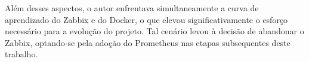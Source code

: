 Além desses aspectos, o autor enfrentava simultaneamente a curva de aprendizado do Zabbix e do Docker, o que elevou significativamente o esforço necessário para a evolução do projeto. Tal cenário levou à decisão de abandonar o Zabbix, optando-se pela adoção do Prometheus nas etapas subsequentes deste trabalho.





    
     

    
